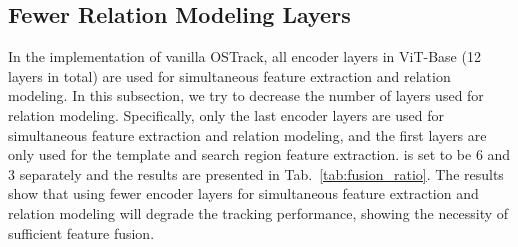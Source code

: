 \begin{table}[t]
\caption{Add additional relation modeling module to our OSTrack-256 (without the early candidate elimination module).}
\centering
\label{tab:add_relation}
\end{table}

\subsection{Fewer Relation Modeling Layers}
In the implementation of vanilla OSTrack, all encoder layers in ViT-Base (12 layers in total) are used for simultaneous feature extraction and relation modeling. In this subsection, we try to decrease the number of layers used for relation modeling. Specifically, only the last  encoder layers are used for  simultaneous feature extraction and relation modeling, and the first  layers are only used for the template and search region feature extraction.  is set to be 6 and 3 separately and the results are presented in Tab.~\ref{tab:fusion_ratio}. The results show that using fewer encoder layers for simultaneous feature extraction and relation modeling will degrade the tracking performance, showing the necessity of sufficient feature fusion.

\begin{table}[t]
\caption{Ablation studies on the number of encoder layers used for relation modeling.}
\centering
{}
\label{tab:fusion_ratio}
\end{table}

